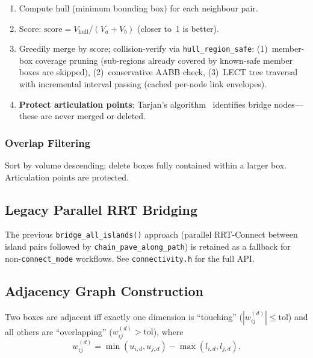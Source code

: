 \documentclass[journal]{IEEEtran}
\begin{document}
\begin{enumerate}[nosep]
  \item Compute hull (minimum bounding box) for each neighbour pair.
  \item Score: $\text{score} = V_\text{hull} / (V_a + V_b)$
    (closer to~1 is better).
  \item Greedily merge by score; collision-verify via
    \texttt{hull\_region\_safe}: (1)~member-box coverage pruning
    (sub-regions already covered by known-safe member boxes are
    skipped), (2)~conservative AABB check, (3)~LECT tree traversal
    with incremental interval passing (cached per-node link
    envelopes).
  \item \textbf{Protect articulation points}: Tarjan's
    algorithm~\cite{tarjan1972depth} identifies bridge nodes---these
    are never merged or deleted.
\end{enumerate}

\subsubsection{Overlap Filtering}

Sort by volume descending; delete boxes fully contained within a
larger box.
Articulation points are protected.

\subsection{Legacy Parallel RRT Bridging}

The previous \texttt{bridge\_all\_islands()} approach (parallel
RRT-Connect between island pairs followed by
\texttt{chain\_pave\_along\_path}) is retained as a fallback for
non-\texttt{connect\_mode} workflows.  See \texttt{connectivity.h}
for the full API.

\subsection{Adjacency Graph Construction}

Two boxes are adjacent iff exactly one dimension is ``touching''
($|w_{ij}^{(d)}| \leq \text{tol}$) and all others are
``overlapping'' ($w_{ij}^{(d)} > \text{tol}$), where
\begin{equation}
  w_{ij}^{(d)} = \min(u_{i,d}, u_{j,d}) - \max(l_{i,d}, l_{j,d}).
\end{equation}

\end{document}
